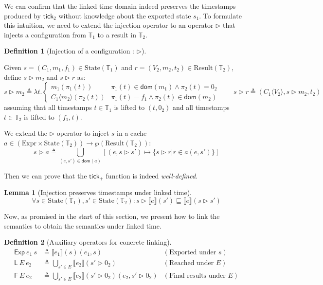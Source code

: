 \documentclass[acmsmall,review]{acmart}\settopmatter{printfolios=true,printccs=false,printacmref=false}
\theoremstyle{definition}
\newtheorem{definition}{Definition}[section]
\newtheorem{lem}{Lemma}[section]
\newcommand*{\Expr}{\text{Expr}}
\newcommand*{\Time}{\mathbb{T}}
\newcommand*{\mem}{m}
\newcommand*{\State}[1]{\text{State}({#1})}
\newcommand*{\Result}[1]{\text{Result}({#1})}
\newcommand*{\EE}{\mathsf{Exp}}
\newcommand*{\LL}{\mathsf{L}}
\newcommand*{\sembracket}[1]{\lBrack{#1}\rBrack}
\newcommand*{\tick}{\mathsf{tick}}
\newcommand*{\inject}[2]{{#1}\langle{#2}\rangle}
\begin{document}
We can confirm that the linked time domain indeed preserves the timestamps produced by $\tick_2$ without knowledge about the exported state $s_1$.
To formulate this intuition, we need to extend the injection operator to an operator $\rhd$ that injects a configuration from $\Time_1$ to a result in $\Time_2$.
\begin{definition}[Injection of a configuration : $\rhd$]
  $\:$

  Given ${s}=({C_1},{\mem_1},{f_1})\in\State{\Time_1}$ and ${r}=({V_2},{\mem_2},t_2)\in\Result{\Time_2}$,
  define $s\rhd m_2$ and $s\rhd r$ as:
  \[
    s\rhd m_2\triangleq
    \lambda t.
    \begin{cases}
      m_1(\pi_1(t))               & \pi_1(t)\in\mathsf{dom}(m_1)\wedge\pi_2(t)=0_2 \\
      \inject{C_1}{m_2}(\pi_2(t)) & \pi_1(t)=f_1\wedge\pi_2(t)\in\mathsf{dom}(m_2)
    \end{cases}
    \qquad
    s\rhd r\triangleq
    (\inject{C_1}{V_2},s\rhd m_2,t_2)
  \]
  assuming that all timestamps $t\in\Time_1$ is lifted to $(t,0_2)$ and all timestamps $t\in\Time_2$ is lifted to $(f_1,t)$.

  We extend the $\rhd$ operator to inject ${s}$ in a cache $a\in(\Expr\times\State{\Time_2})\rightarrow{\wp(\Result{\Time_2})}$:
  \[
    {s}\rhd{a}\triangleq\bigcup_{(e,{s'})\in\mathsf{dom}({a})}[(e,{s}\rhd{s'})\mapsto\{{s}\rhd{r}|{r}\in{a}(e,{s'})\}]
  \]
\end{definition}

Then we can prove that the $\tick_+$ function is indeed \emph{well-defined}.

\begin{lem}[Injection preserves timestamps under linked time]
  \[
    \forall s\in\State{\Time_1},s'\in\State{\Time_2}:{s}\rhd{\sembracket{e}}({s'})\sqsubseteq{\sembracket{e}}({s}\rhd{s'})
  \]
\end{lem}

Now, as promised in the start of this section, we present how to link the semantics to obtain the semantics under linked time.

\begin{definition}[Auxiliary operators for concrete linking]
  \begin{align*}
    \EE\:e_1\:s        & \triangleq\sembracket{e_1}(s)(e_1,s)                                    & (\text{Exported under }s)      \\
    \LL\:E\:e_2        & \triangleq\bigcup_{s'\in E}\sembracket{e_2}(s'\rhd 0_2)                 & (\text{Reached under }E)       \\
    \mathsf{F}\:E\:e_2 & \triangleq\bigcup_{s'\in E}\sembracket{e_2}(s'\rhd 0_2)(e_2,s'\rhd 0_2) & (\text{Final results under }E)
  \end{align*}
\end{definition}
\end{document}
